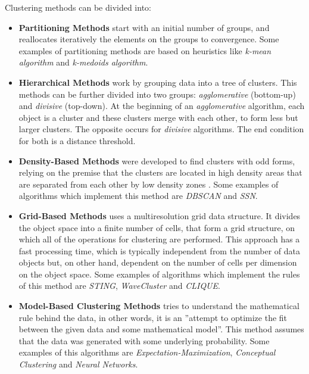 Clustering methods can be divided into\cite{HanKam06}: \begin{itemize} \item
      \textbf{Partitioning Methods} start with an initial number of groups, and
      reallocates iteratively the elements on the groups to
      convergence\cite{DBLP:journals/corr/abs-1205-1117}. Some examples of
      partitioning methods are based on heuristics like \emph{k-mean algorithm}
      and \emph{k-medoids algorithm}.

\item \textbf{Hierarchical Methods} work by grouping data into a tree of
  clusters\cite{HanKam06}. This methods can be further divided into two groups:
  \emph{agglomerative} (bottom-up) and \emph{divisive}
  (top-down)\cite{DBLP:journals/corr/abs-1205-1117}. At the beginning of an
  \emph{agglomerative} algorithm, each object is a cluster and these clusters
  merge with each other, to form less but larger clusters. The opposite occurs
  for \emph{divisive} algorithms. The end condition for both is a distance
  threshold.\cite{HanKam06}

\item \textbf{Density-Based Methods} were developed to find clusters with odd
  forms, relying on the premise that the clusters are located in high density
  areas that are separated from each other by low density zones \cite{HanKam06}.
  Some examples of algorithms which implement this method are \emph{DBSCAN} and
  \emph{SSN}.

\item \textbf{Grid-Based Methods} uses a multiresolution grid data structure. It
  divides the object space into a finite number of cells, that form a grid
  structure, on which all of the operations for clustering are performed. This
  approach has a fast processing time, which is typically independent from the
  number of data objects but, on other hand, dependent on the number of cells
  per dimension on the object space\cite{HanKam06}. Some examples of algorithms
  which implement the rules of this method are \emph{STING}, \emph{WaveCluster}
  and \emph{CLIQUE}.

\item \textbf{Model-Based Clustering Methods} tries to understand the
  mathematical rule behind the data, in other words, it is an ''attempt to
  optimize the fit between the given data and some mathematical model''\cite[p.
  429]{HanKam06}. This method assumes that the data was generated with some
  underlying probability. Some examples of this algorithms are
  \emph{Expectation-Maximization}, \emph{Conceptual Clustering} and \emph{Neural
  Networks}.

\end{itemize}
